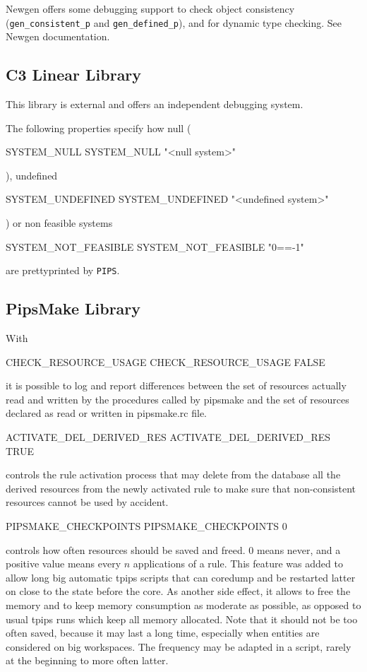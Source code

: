 \documentclass[a4paper]{report}
\begin{document}
Newgen offers some debugging support to check object consistency
(\verb+gen_consistent_p+ and \verb+gen_defined_p+), and for dynamic type
checking. See Newgen documentation\cite{JT89}\cite{JT90}.

\subsection{C3 Linear Library}

This library is external and offers an independent debugging system.

The following properties specify how null (
\begin{PipsProp}{SYSTEM_NULL}
SYSTEM_NULL "<null system>"
\end{PipsProp}
),
undefined
\begin{PipsProp}{SYSTEM_UNDEFINED}
SYSTEM_UNDEFINED "<undefined system>"
\end{PipsProp}
) or non feasible
systems
\begin{PipsProp}{SYSTEM_NOT_FEASIBLE}
SYSTEM_NOT_FEASIBLE "{0==-1}"
\end{PipsProp}
are prettyprinted by {\tt PIPS}.

\subsection{PipsMake Library}

With
\begin{PipsProp}{CHECK_RESOURCE_USAGE}
CHECK_RESOURCE_USAGE FALSE
\end{PipsProp}
it is possible to log and report differences between the set of resources
actually read and written by the procedures called by pipsmake and the set
of resources declared as read or written in pipsmake.rc file.

\begin{PipsProp}{ACTIVATE_DEL_DERIVED_RES}
ACTIVATE_DEL_DERIVED_RES TRUE
\end{PipsProp}
controls the rule activation process that may delete from the database all the
derived resources from the newly activated rule to make sure that
non-consistent resources cannot be used by accident.

\begin{PipsProp}{PIPSMAKE_CHECKPOINTS}
PIPSMAKE_CHECKPOINTS 0
\end{PipsProp}
controls how often resources should be saved and freed. $0$ means never, and
a positive value means every $n$ applications of a rule. This feature
was added to allow long big automatic tpips scripts that can coredump and
be restarted latter on close to the state before the core. As another side
effect, it allows to free the memory and to keep memory consumption as
moderate as possible, as opposed to usual tpips runs which keep all
memory allocated. Note that it should not be too often saved, because it
may last a long time, especially when entities are considered on big
workspaces. The frequency may be adapted in a script, rarely at the
beginning to more often latter.
\end{document}
